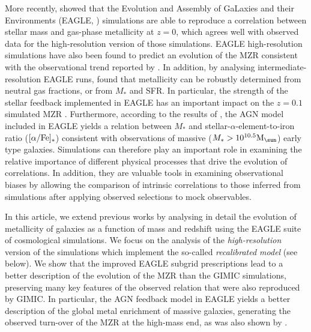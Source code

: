 \documentclass[useAMS,usenatbib]{mn2e}
\begin{document}
More recently, \citet{schaye2015} showed that the Evolution and Assembly of GaLaxies 
and their Environments ({\sc EAGLE}, \citealt{schaye2015}) simulations are able to reproduce
a correlation between stellar mass and gas-phase metallicity at $z=0$, which agrees well with observed data
\citep{tremonti2004, zahid2014a}
for the high-resolution version of those simulations. 
{\sc EAGLE} high-resolution simulations have also been found to predict an evolution of the 
MZR consistent with the observational trend reported by \citet{zahid2013b} \citep[e.g.][]{guo2016}.
In addition, by analysing intermediate-resolution {\sc EAGLE} runs, 
\citet{lagos2015} found that metallicity
can be robustly determined from neutral gas fractions, or from $M_*$ and SFR.
In particular, the strength of the stellar feedback implemented in {\sc EAGLE} has an important impact on the $z=0.1$ simulated MZR \citep{crain2015}.
Furthermore, according to the results of \citet{segers2016a}, the AGN model included in {\sc EAGLE} yields 
a relation between $M_*$ and stellar-$\alpha$-element-to-iron ratio ($[{\rm \alpha / Fe}]_*$) consistent
with observations of massive ($M_* > 10^{10.5} {\rm M}_{\sun}$) early type galaxies.   
Simulations can therefore play an important role in examining the relative importance of different
physical processes that drive the evolution of correlations.  In addition, they are valuable tools 
in examining observational biases by allowing the comparison of intrinsic correlations to those inferred
from simulations after applying observed selections to mock observables.

In this article, we extend previous works by analysing in detail the evolution of 
metallicity of galaxies as a function of mass and redshift using the {\sc EAGLE} 
suite of cosmological simulations. 
We focus on the analysis of the {\em high-resolution} version of the simulations which implement
the so-called {\em recalibrated model} (see below). We show that the improved {\sc EAGLE} subgrid prescriptions lead to a better description
of the evolution of the MZR than the {\sc GIMIC} simulations, preserving many key features of the observed relation that were also reproduced by {\sc GIMIC}.
In particular, the AGN feedback model in {\sc EAGLE} yields a better description
of the global metal enrichment of massive galaxies, generating the observed turn-over of the MZR at the high-mass
end, as was also shown by \citet{segers2016b}.
\end{document}
